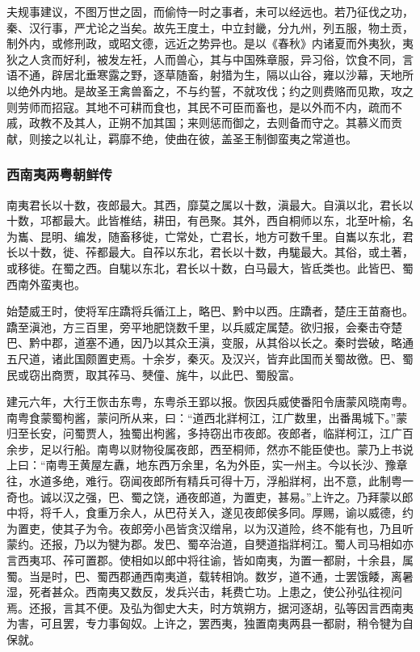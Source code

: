 \documentclass[]{article}
\begin{document}
夫规事建议，不图万世之固，而偷恃一时之事者，未可以经远也。若乃征伐之功，秦、汉行事，严尤论之当矣。故先王度土，中立封畿，分九州，列五服，物土贡，制外内，或修刑政，或昭文德，远近之势异也。是以《春秋》内诸夏而外夷狄，夷狄之人贪而好利，被发左衽，人而兽心，其与中国殊章服，异习俗，饮食不同，言语不通，辟居北垂寒露之野，逐草随畜，射猎为生，隔以山谷，雍以沙幕，天地所以绝外内地。是故圣王禽兽畜之，不与约誓，不就攻伐；约之则费赂而见欺，攻之则劳师而招寇。其地不可耕而食也，其民不可臣而畜也，是以外而不内，疏而不戚，政教不及其人，正朔不加其国；来则惩而御之，去则备而守之。其慕义而贡献，则接之以礼让，羁靡不绝，使曲在彼，盖圣王制御蛮夷之常道也。

\hypertarget{header-n6313}{%
\subsubsection{西南夷两粤朝鲜传}\label{header-n6313}}

南夷君长以十数，夜郎最大。其西，靡莫之属以十数，滇最大。自滇以北，君长以十数，邛都最大。此皆椎结，耕田，有邑聚。其外，西自桐师以东，北至叶榆，名为巂、昆明、编发，随畜移徙，亡常处，亡君长，地方可数千里。自巂以东北，君长以十数，徙、莋都最大。自莋以东北，君长以十数，冉駹最大。其俗，或土著，或移徙。在蜀之西。自駹以东北，君长以十数，白马最大，皆氐类也。此皆巴、蜀西南外蛮夷也。

始楚威王时，使将军庄蹻将兵循江上，略巴、黔中以西。庄蹻者，楚庄王苗裔也。蹻至滇池，方三百里，旁平地肥饶数千里，以兵威定属楚。欲归报，会秦击夺楚巴、黔中郡，道塞不通，因乃以其众王滇，变服，从其俗以长之。秦时尝破，略通五尺道，诸此国颇置吏焉。十余岁，秦灭。及汉兴，皆弃此国而关蜀故徼。巴、蜀民或窃出商贾，取其莋马、僰僮、旄牛，以此巴、蜀殷富。

建元六年，大行王恢击东粤，东粤杀王郢以报。恢因兵威使番阳令唐蒙风晓南粤。南粤食蒙蜀枸酱，蒙问所从来，曰：``道西北牂柯江，江广数里，出番禺城下。''蒙归至长安，问蜀贾人，独蜀出枸酱，多持窃出市夜郎。夜郎者，临牂柯江，江广百余步，足以行船。南粤以财物役属夜郎，西至桐师，然亦不能臣使也。蒙乃上书说上曰：``南粤王黄屋左纛，地东西万余里，名为外臣，实一州主。今以长沙、豫章往，水道多绝，难行。窃闻夜郎所有精兵可得十万，浮船牂柯，出不意，此制粤一奇也。诚以汉之强，巴、蜀之饶，通夜郎道，为置吏，甚易。''上许之。乃拜蒙以郎中将，将千人，食重万余人，从巴苻关入，遂见夜郎侯多同。厚赐，谕以威德，约为置吏，使其子为令。夜郎旁小邑皆贪汉缯帛，以为汉道险，终不能有也，乃且听蒙约。还报，乃以为犍为郡。发巴、蜀卒治道，自僰道指牂柯江。蜀人司马相如亦言西夷邛、莋可置郡。使相如以郎中将往谕，皆如南夷，为置一都尉，十余县，属蜀。当是时，巴、蜀西郡通西南夷道，载转相饷。数岁，道不通，士罢饿餧，离暑湿，死者甚众。西南夷又数反，发兵兴击，耗费亡功。上患之，使公孙弘往视问焉。还报，言其不便。及弘为御史大夫，时方筑朔方，据河逐胡，弘等因言西南夷为害，可且罢，专力事匈奴。上许之，罢西夷，独置南夷两县一都尉，稍令犍为自保就。
\end{document}
